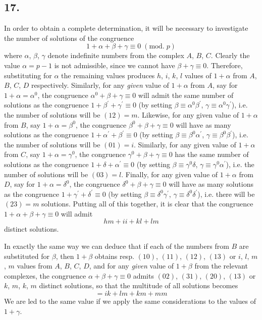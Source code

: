 \documentclass[twoside,12pt]{memoir}
\renewcommand{\pmod}[1]{\;(\textrm{mod.}\;#1)}
\begin{document}
\subsection*{17.}

In order to obtain a complete determination, it will be necessary to investigate the number of solutions of the congruence
\[1+\alpha+\beta+\gamma \equiv 0\pmod{p}\]
where \(\alpha\), \(\beta\), \(\gamma\) denote indefinite numbers from the complex \(A\), \(B\), \(C\). Clearly the value \(\alpha=p-1\) is not admissible, since we cannot have \(\beta+\gamma \equiv 0\). Therefore, substituting for \(\alpha\) the remaining values produces \(h\), \(i\), \(k\), \(l\) values of \(1+\alpha\) from \(A\), \(B\), \(C\), \(D\) respectively. Similarly, for any \textit{given} value of \(1+\alpha\) from \(A\), say for \(1+\alpha=\alpha^{0}\), the congruence \(\alpha^{0}+\beta+\gamma \equiv 0\) will admit the same number of solutions as the congruence \(1+\beta^{\prime}+\gamma^{\prime} \equiv 0\) (by setting \(\beta \equiv \alpha^{0} \beta^{\prime}\), \(\gamma \equiv \alpha^{0} \gamma^{\prime}\)), i{.}e{.} the number of solutions will be \((12)=m\). Likewise, for any given value of \(1+\alpha\) from \(B\), say \(1+\alpha=\beta^{0}\), the congruence \(\beta^{0}+\beta+\gamma \equiv 0\) will have as many solutions as the congruence \(1+\alpha^{\prime}+\beta^{\prime} \equiv 0\) (by setting \(\beta \equiv \beta^{0} \alpha^{\prime}\), \(\gamma \equiv \beta^{0} \beta^{\prime}\)), i{.}e{.} the number of solutions will be \((01)=i\). Similarly, for any given value of \(1+\alpha\) from \(C\), say \(1+\alpha=\gamma^{0}\), the congruence \(\gamma^{0}+\beta+\gamma \equiv 0\) has the same number of solutions as the congruence \(1+\delta+\alpha^{\prime} \equiv 0\) (by setting \(\beta \equiv \gamma^{0} \delta\), \(\gamma \equiv \gamma^{0} \alpha^{\prime}\)), i{.}e{.} the number of solutions will be \((03)=l\). Finally, for any given value of \(1+\alpha\) from \(D\), say for \(1+\alpha=\delta^{0}\), the congruence \(\delta^{0}+\beta+\gamma \equiv 0\) will have as many solutions as the congruence \(1+\gamma^{\prime}+\delta^{\prime} \equiv 0\) (by setting \(\beta \equiv \delta^{0} \gamma^{\prime}\), \(\gamma \equiv \delta^{0} \delta^{\prime}\)), i{.}e{.} there will be \((23)=m\) solutions. Putting all of this together, it is clear that the congruence \(1+\alpha+\beta+\gamma \equiv 0\) will admit
\[h m+i i+k l+l m\]
distinct solutions.

In exactly the same way we can deduce that if each of the numbers from \(B\) are substituted for \(\beta\), then \(1+\beta\) obtains resp{.} \((10)\), \((11)\), \((12)\), \((13)\) or \(i\), \(l\), \(m\), \(m\) values from \(A\), \(B\), \(C\), \(D\), and for any \textit{given} value of \(1+\beta\) from the relevant complexes, the congruence \(\alpha+\beta+\gamma \equiv 0\) admits \((02)\), \((31)\), \((20)\), \((13)\) or \(k\), \(m\), \(k\), \(m\) distinct solutions, so that the multitude of all solutions becomes\pagebreak%
\[=i k+l m+k m+m m\]
We are led to the same value if we apply the same considerations to the values of \(1+\gamma\).
\end{document}
